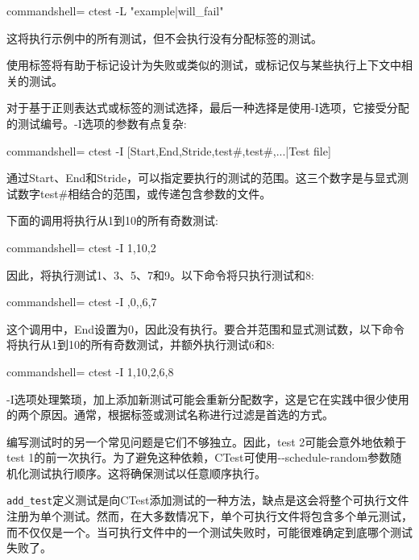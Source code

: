 \begin{tcblisting}{commandshell={}}
ctest -L "example|will_fail"
\end{tcblisting}

这将执行示例中的所有测试，但不会执行没有分配标签的测试。

使用标签将有助于标记设计为失败或类似的测试，或标记仅与某些执行上下文中相关的测试。

对于基于正则表达式或标签的测试选择，最后一种选择是使用-I选项，它接受分配的测试编号。-I选项的参数有点复杂:

\begin{tcblisting}{commandshell={}}
ctest -I [Start,End,Stride,test#,test#,...|Test file]
\end{tcblisting}

通过Start、End和Stride，可以指定要执行的测试的范围。这三个数字是与显式测试数字test\#相结合的范围，或传递包含参数的文件。

下面的调用将执行从1到10的所有奇数测试:

\begin{tcblisting}{commandshell={}}
ctest -I 1,10,2
\end{tcblisting}

因此，将执行测试1、3、5、7和9。以下命令将只执行测试和8:

\begin{tcblisting}{commandshell={}}
ctest -I ,0,,6,7
\end{tcblisting}

这个调用中，End设置为0，因此没有执行。要合并范围和显式测试数，以下命令将执行从1到10的所有奇数测试，并额外执行测试6和8:

\begin{tcblisting}{commandshell={}}
ctest -I 1,10,2,6,8
\end{tcblisting}

-I选项处理繁琐，加上添加新测试可能会重新分配数字，这是它在实践中很少使用的两个原因。通常，根据标签或测试名称进行过滤是首选的方式。

编写测试时的另一个常见问题是它们不够独立。因此，test 2可能会意外地依赖于test 1的前一次执行。为了避免这种依赖，CTest可使用-{}-schedule-random参数随机化测试执行顺序。这将确保测试以任意顺序执行。


\texttt{add\_test}定义测试是向CTest添加测试的一种方法，缺点是这会将整个可执行文件注册为单个测试。然而，在大多数情况下，单个可执行文件将包含多个单元测试，而不仅仅是一个。当可执行文件中的一个测试失败时，可能很难确定到底哪个测试失败了。

